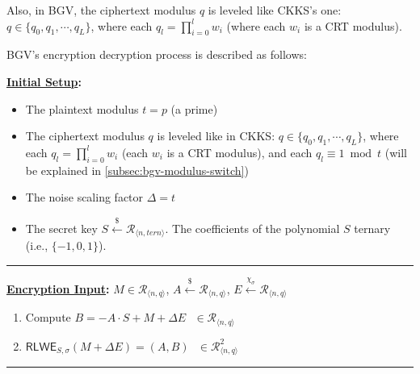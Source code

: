 Also, in BGV, the ciphertext modulus $q$ is leveled like CKKS's one: $q \in \{q_0, q_1, \cdots, q_L\}$, where each $q_l = \prod\limits_{i=0}^l w_i$ (where each $w_i$ is a CRT modulus). 

BGV's encryption decryption process is described as follows:


\begin{tcolorbox}[title={\textbf{\tboxlabel{\ref*{subsec:bgv-enc-dec}} BGV Encryption and Decryption}}]

\textbf{\underline{Initial Setup}:} 

\begin{itemize}
\item The plaintext modulus $t = p$ (a prime)

\item The ciphertext modulus $q$ is leveled like in CKKS: $q \in \{q_0, q_1, \cdots, q_L\}$, where each $q_l = \prod\limits_{i=0}^l w_i$ (each $w_i$ is a CRT modulus), and each $q_l \equiv 1 \bmod t$ (will be explained in \autoref{subsec:bgv-modulus-switch})

\item The noise scaling factor $\Delta=t$ 
\item The secret key $S \xleftarrow{\$} \mathcal{R}_{\langle n, \textit{tern} \rangle}$. The coefficients of the polynomial $S$ ternary (i.e., $\{-1, 0, 1\}$).

\end{itemize}

\par\noindent\rule{\textwidth}{0.4pt}

\textbf{\underline{Encryption Input}:} $M \in \mathcal{R}_{\langle n, q \rangle}$, $A \xleftarrow{\$} \mathcal{R}_{\langle n, q \rangle}$, $E \xleftarrow{\chi_\sigma} \mathcal{R}_{\langle n, q \rangle}$


\begin{enumerate}

\item Compute $B = -A \cdot S + M + \Delta E \text{ } \in \mathcal{R}_{\langle n,q \rangle}$

\item $\textsf{RLWE}_{S,\sigma}(M + \Delta E) = (A, B) \text{ } \in \mathcal{R}_{\langle n,q \rangle}^2$ 

\end{enumerate}

\par\noindent\rule{\textwidth}{0.4pt}


\end{tcolorbox}
